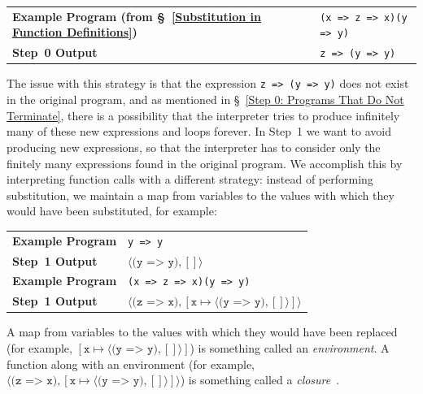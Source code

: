 \documentclass[12pt, oneside]{book}
\begin{document}
\begin{center}
\begin{tabular}{ll}
\textbf{Example Program \textmd{(from §~\ref{Substitution in Function Definitions})}} & \texttt{(x => z => x)(y => y)} \\
\textbf{Step~0 Output} & \texttt{z => (y => y)} \\
\end{tabular}
\end{center}

The issue with this strategy is that the expression \texttt{z => (y => y)} does not exist in the original program, and as mentioned in §~\ref{Step 0: Programs That Do Not Terminate}, there is a possibility that the interpreter tries to produce infinitely many of these new expressions and loops forever. In Step~1 we want to avoid producing new expressions, so that the interpreter has to consider only the finitely many expressions found in the original program. We accomplish this by interpreting function calls with a different strategy: instead of performing substitution, we maintain a map from variables to the values with which they would have been substituted, for example:

\begin{center}
\begin{tabular}{ll}
\textbf{Example Program} & \texttt{y => y} \\
\textbf{Step~1 Output} & $\langle \texttt{(y => y)}, [] \rangle$ \\
\textbf{Example Program} & \texttt{(x => z => x)(y => y)} \\
\textbf{Step~1 Output} & $\langle \texttt{(z => x)}, [\texttt{x} \mapsto \langle \texttt{(y => y)}, [] \rangle] \rangle$ \\
\end{tabular}
\end{center}

\begin{mdframed}[frametitle = {Technical Terms}]
A map from variables to the values with which they would have been replaced (for example, $[\texttt{x} \mapsto \langle \texttt{(y => y)}, [] \rangle]$) is something called an \emph{environment}. A function along with an environment (for example, $\langle \texttt{(z => x)}, [\texttt{x} \mapsto \langle \texttt{(y => y)}, [] \rangle] \rangle$) is something called a \emph{closure}~\cite{closures}.
\end{mdframed}
\end{document}
